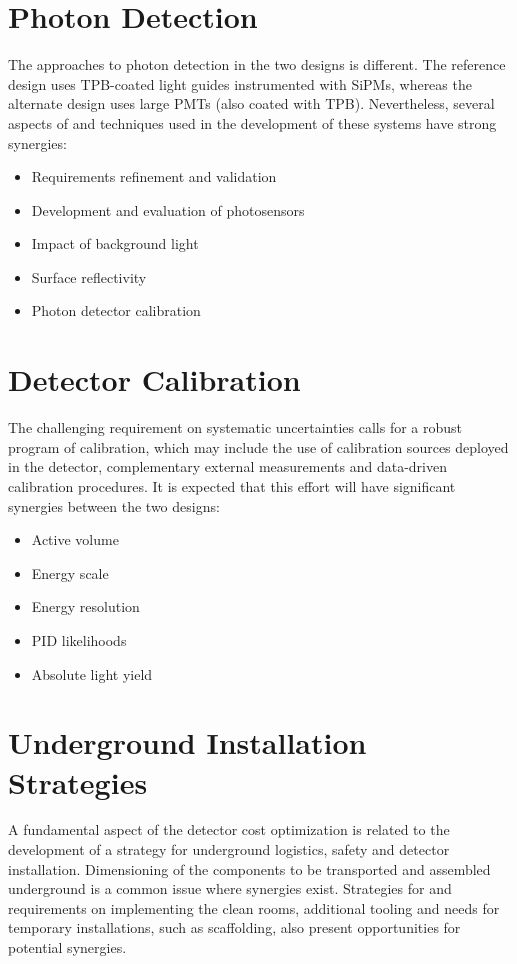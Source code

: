  
\section{Photon Detection}

The approaches to photon detection in the two designs is
different.  The reference design uses TPB-coated light guides
instrumented with SiPMs, whereas the alternate design uses large PMTs
(also coated with TPB). Nevertheless, several aspects of and
techniques used in the development of these systems have strong synergies:
\begin{itemize}
\item Requirements refinement and validation
\item Development and evaluation of photosensors
\item Impact of background light
\item  Surface reflectivity
\item Photon detector calibration
\end{itemize}


\section{Detector Calibration}

The challenging requirement on systematic uncertainties calls for a
robust program of calibration, which may include the use of calibration sources
deployed in the detector, complementary external measurements
and data-driven calibration procedures. It is expected that this effort
will have significant synergies between the two designs:
\begin{itemize}
\item Active volume
\item Energy scale
\item Energy resolution
\item PID likelihoods
\item Absolute light yield	
\end{itemize}


\section{Underground Installation Strategies}

A fundamental aspect of the detector cost optimization is related to
the development of a strategy for underground logistics, safety and detector
installation. Dimensioning of the components to be transported and
assembled underground is a common issue where synergies
exist. Strategies for and requirements on implementing the clean
rooms, additional tooling and needs for temporary installations, such
as scaffolding, also present opportunities for potential synergies.

